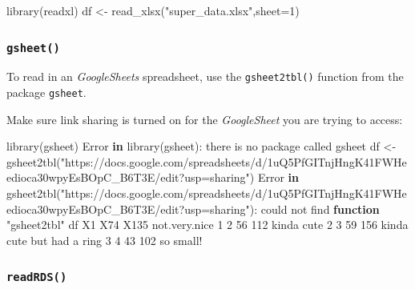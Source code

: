\documentclass[
]{book}
\newenvironment{Shaded}{\begin{snugshade}}{\end{snugshade}}
\newcommand{\AttributeTok}[1]{\textcolor[rgb]{0.77,0.63,0.00}{#1}}
\newcommand{\ControlFlowTok}[1]{\textcolor[rgb]{0.13,0.29,0.53}{\textbf{#1}}}
\newcommand{\DecValTok}[1]{\textcolor[rgb]{0.00,0.00,0.81}{#1}}
\newcommand{\FunctionTok}[1]{\textcolor[rgb]{0.00,0.00,0.00}{#1}}
\newcommand{\NormalTok}[1]{#1}
\newcommand{\OtherTok}[1]{\textcolor[rgb]{0.56,0.35,0.01}{#1}}
\newcommand{\SpecialCharTok}[1]{\textcolor[rgb]{0.00,0.00,0.00}{#1}}
\newcommand{\StringTok}[1]{\textcolor[rgb]{0.31,0.60,0.02}{#1}}
\begin{document}
\begin{Shaded}
\begin{Highlighting}[]
\FunctionTok{library}\NormalTok{(readxl)}
\NormalTok{df }\OtherTok{\textless{}{-}} \FunctionTok{read\_xlsx}\NormalTok{(}\StringTok{"super\_data.xlsx"}\NormalTok{,}\AttributeTok{sheet=}\DecValTok{1}\NormalTok{)}
\end{Highlighting}
\end{Shaded}

\hypertarget{gsheet}{%
\subsubsection*{\texorpdfstring{\texttt{gsheet()}}{gsheet()}}\label{gsheet}}

To read in an \emph{GoogleSheets} spreadsheet, use the \texttt{gsheet2tbl()} function from the package \texttt{gsheet}.

Make sure link sharing is turned on for the \emph{GoogleSheet} you are trying to access:

\begin{Shaded}
\begin{Highlighting}[]
\FunctionTok{library}\NormalTok{(gsheet)}
\NormalTok{Error }\ControlFlowTok{in} \FunctionTok{library}\NormalTok{(gsheet)}\SpecialCharTok{:}\NormalTok{ there is no package called }\StringTok{\textquotesingle{}gsheet\textquotesingle{}}
\NormalTok{df }\OtherTok{\textless{}{-}} \FunctionTok{gsheet2tbl}\NormalTok{(}\StringTok{"https://docs.google.com/spreadsheets/d/1uQ5PfGITnjHngK41FWHeedioca30wpyEsBOpC\_B6T3E/edit?usp=sharing"}\NormalTok{)}
\NormalTok{Error }\ControlFlowTok{in} \FunctionTok{gsheet2tbl}\NormalTok{(}\StringTok{"https://docs.google.com/spreadsheets/d/1uQ5PfGITnjHngK41FWHeedioca30wpyEsBOpC\_B6T3E/edit?usp=sharing"}\NormalTok{)}\SpecialCharTok{:}\NormalTok{ could not find }\ControlFlowTok{function} \StringTok{"gsheet2tbl"}
\NormalTok{df}
\NormalTok{  X1 X74 X135             not.very.nice}
\DecValTok{1}  \DecValTok{2}  \DecValTok{56}  \DecValTok{112}\NormalTok{                kinda cute}
\DecValTok{2}  \DecValTok{3}  \DecValTok{59}  \DecValTok{156}\NormalTok{ kinda cute but had a ring}
\DecValTok{3}  \DecValTok{4}  \DecValTok{43}  \DecValTok{102}\NormalTok{                 so small}\SpecialCharTok{!}
\end{Highlighting}
\end{Shaded}

\hypertarget{readrds}{%
\subsubsection*{\texorpdfstring{\texttt{readRDS()}}{readRDS()}}\label{readrds}}
\end{document}
